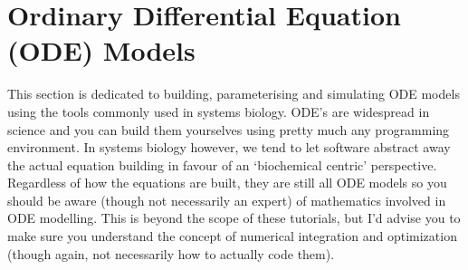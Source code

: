 \documentclass[../main]{subfiles}
\begin{document}
    \section{Ordinary Differential Equation (ODE) Models}
    This section is dedicated to building, parameterising and simulating ODE models using the tools
    commonly used in systems biology. ODE's are widespread in science and you can build them yourselves
    using pretty much any programming environment. In systems biology however, we tend to let
    software abstract away the actual equation building in favour of an `biochemical centric' perspective. Regardless
    of how the equations are built, they are still all ODE models so you should be aware (though not necessarily an
    expert) of mathematics involved in ODE modelling. This is beyond the scope of these tutorials, but I'd advise you
    to make sure you understand the concept of numerical integration and optimization (though again, not necessarily how
    to actually code them).

    
    
\end{document}
